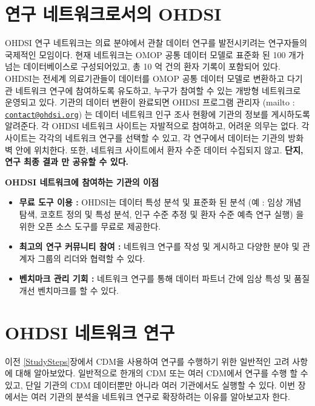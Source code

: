 \documentclass[11pt]{book}
\providecommand{\tightlist}{%
  \setlength{\itemsep}{0pt}\setlength{\parskip}{0pt}}
\theoremstyle{definition}
\theoremstyle{definition}
\theoremstyle{definition}
\theoremstyle{remark}
\let\BeginKnitrBlock\begin \let\EndKnitrBlock\end
\begin{document}
\section{연구 네트워크로서의 OHDSI}\label{--ohdsi}


OHDSI 연구 네트워크는 의료 분야에서 관찰 데이터 연구를 발전시키려는
연구자들의 국제적인 모임이다. 현재 네트워크는 OMOP 공통 데이터 모델로
표준화 된 100 개가 넘는 데이터베이스로 구성되어있고, 총 10 억 건의 환자
기록이 포함되어 있다. OHDSI는 전세계 의료기관들이 데이터를 OMOP 공통
데이터 모델로 변환하고 다기관 네트워크 연구에 참여하도록 유도하고,
누구가 참여할 수 있는 개방형 네트워크로 운영되고 있다. 기관의 데이터
변환이 완료되면 OHDSI 프로그램 관리자 (mailto :
\href{mailto:contact@ohdsi.org}{\nolinkurl{contact@ohdsi.org}}) 는
데이터 네트워크 인구 조사 현황에 기관의 정보를 게시하도록 알려준다. 각
OHDSI 네트워크 사이트는 자발적으로 참여하고, 어려운 의무는 없다. 각
사이트는 각각의 네트워크 연구를 선택할 수 있고, 각 연구에서 데이터는
기관의 방화벽 안에 위치한다. 또한, 네트워크 사이트에서 환자 수준 데이터
수집되지 않고. \textbf{단지, 연구 최종 결과 만 공유할 수 있다.}

\BeginKnitrBlock{rmdimportant}
\textbf{OHDSI 네트워크에 참여하는 기관의 이점}

\begin{itemize}
\tightlist
\item
  \textbf{무료 도구 이용 :} OHDSI는 데이터 특성 분석 및 표준화 된 분석
  (예 : 임상 개념 탐색, 코호트 정의 및 특성 분석, 인구 수준 추정 및 환자
  수준 예측 연구 실행) 을 위한 오픈 소스 도구를 무료로 제공한다.
\item
  \textbf{최고의 연구 커뮤니티 참여 :} 네트워크 연구를 작성 및 게시하고
  다양한 분야 및 관계자 그룹의 리더와 협력할 수 있다.
\item
  \textbf{벤치마크 관리 기회 :} 네트워크 연구를 통해 데이터 파트너 간에
  임상 특성 및 품질 개선 벤치마크를 할 수 있다.
\end{itemize}
\EndKnitrBlock{rmdimportant}

\section{OHDSI 네트워크 연구}\label{ohdsi--}


이전 \ref{StudySteps}장에서 CDM을 사용하여 연구를 수행하기 위한 일반적인
고려 사항에 대해 알아보았다. 일반적으로 한개의 CDM 또는 여러 CDM에서
연구를 수행 할 수 있고, 단일 기관의 CDM 데이터뿐만 아니라 여러
기관에서도 실행할 수 있다. 이번 장에서는 여러 기관의 분석을 네트워크
연구로 확장하려는 이유를 알아보고자 한다.
\end{document}

